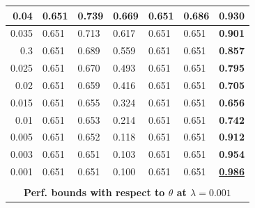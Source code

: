\documentclass[letterpaper, 10 pt, conference]{ieeeconf}
\begin{document}
\begin{figure}[!h]
\begin{minipage}{\columnwidth}
{\begin{tabular}{|lllllll|}
\multicolumn{1}{|r|}{0.04} & \multicolumn{1}{l|}{0.651} & \multicolumn{1}{l|}{0.739} & \multicolumn{1}{l|}{0.669} & \multicolumn{1}{l|}{0.651} & \multicolumn{1}{l|}{0.686} & \textbf{0.930} \\ \hline
\multicolumn{1}{|r|}{0.035} & \multicolumn{1}{l|}{0.651} & \multicolumn{1}{l|}{0.713} & \multicolumn{1}{l|}{0.617} & \multicolumn{1}{l|}{0.651} & \multicolumn{1}{l|}{0.651} & \textbf{0.901} \\ \hline
\multicolumn{1}{|r|}{0.3} & \multicolumn{1}{l|}{0.651} & \multicolumn{1}{l|}{0.689} & \multicolumn{1}{l|}{0.559} & \multicolumn{1}{l|}{0.651} & \multicolumn{1}{l|}{0.651} & \textbf{0.857} \\ \hline
\multicolumn{1}{|r|}{0.025} & \multicolumn{1}{l|}{0.651} & \multicolumn{1}{l|}{0.670} & \multicolumn{1}{l|}{0.493} & \multicolumn{1}{l|}{0.651} & \multicolumn{1}{l|}{0.651} & \textbf{0.795} \\ \hline
\multicolumn{1}{|r|}{0.02} & \multicolumn{1}{l|}{0.651} & \multicolumn{1}{l|}{0.659} & \multicolumn{1}{l|}{0.416} & \multicolumn{1}{l|}{0.651} & \multicolumn{1}{l|}{0.651} & \textbf{0.705} \\ \hline
\multicolumn{1}{|r|}{0.015} & \multicolumn{1}{l|}{0.651} & \multicolumn{1}{l|}{0.655} & \multicolumn{1}{l|}{0.324} & \multicolumn{1}{l|}{0.651} & \multicolumn{1}{l|}{0.651} & \textbf{0.656} \\ \hline
\multicolumn{1}{|r|}{0.01} & \multicolumn{1}{l|}{0.651} & \multicolumn{1}{l|}{0.653} & \multicolumn{1}{l|}{0.214} & \multicolumn{1}{l|}{0.651} & \multicolumn{1}{l|}{0.651} & \textbf{0.742} \\ \hline
\multicolumn{1}{|r|}{0.005} & \multicolumn{1}{l|}{0.651} & \multicolumn{1}{l|}{0.652} & \multicolumn{1}{l|}{0.118} & \multicolumn{1}{l|}{0.651} & \multicolumn{1}{l|}{0.651} & \textbf{0.912} \\ \hline
\multicolumn{1}{|r|}{0.003} & \multicolumn{1}{l|}{0.651} & \multicolumn{1}{l|}{0.651} & \multicolumn{1}{l|}{0.103} & \multicolumn{1}{l|}{0.651} & \multicolumn{1}{l|}{0.651} & \textbf{0.954} \\ \hline
\multicolumn{1}{|r|}{0.001} & \multicolumn{1}{l|}{0.651} & \multicolumn{1}{l|}{0.651} & \multicolumn{1}{l|}{0.100} & \multicolumn{1}{l|}{0.651} & \multicolumn{1}{l|}{0.651} & {\ul \textbf{0.986}} \\ \hline
\multicolumn{7}{|l|}{\cellcolor[HTML]{C0C0C0}} \\ \hline
\multicolumn{7}{|c|}{\textbf{Perf. bounds with respect to $\theta$ at $\lambda=0.001$}} \\ \hline

\end{tabular}}
\end{minipage}
\end{figure}
\end{document}
